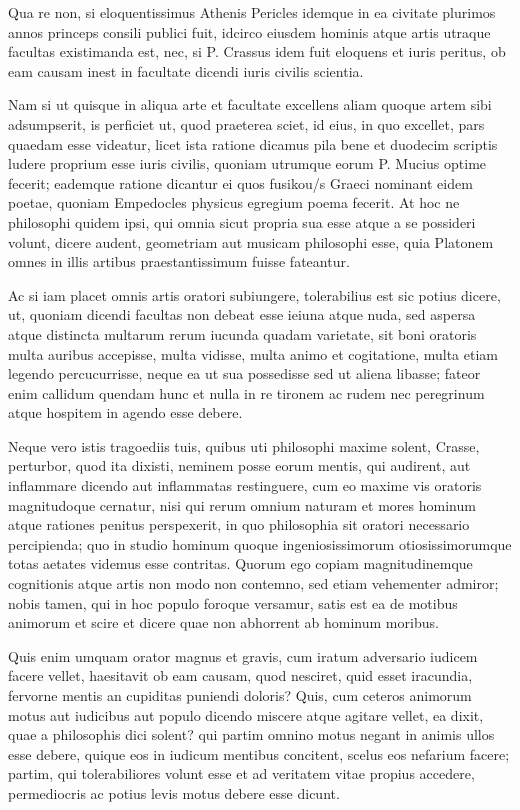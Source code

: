  Qua re non, si eloquentissimus Athenis Pericles idemque in ea civitate plurimos annos princeps consili publici fuit, idcirco eiusdem hominis atque artis utraque facultas existimanda est, nec, si P. Crassus idem fuit eloquens et iuris peritus, ob eam causam inest in facultate dicendi iuris civilis scientia.

 Nam si ut quisque in aliqua arte et facultate excellens aliam quoque artem sibi adsumpserit, is perficiet ut, quod praeterea sciet, id eius, in quo excellet, pars quaedam esse videatur, licet ista ratione dicamus pila bene et duodecim scriptis ludere proprium esse iuris civilis, quoniam utrumque eorum P. Mucius optime fecerit; eademque ratione dicantur ei quos fusikou/s Graeci nominant eidem poetae, quoniam Empedocles physicus egregium poema fecerit. At hoc ne philosophi quidem ipsi, qui omnia sicut propria sua esse atque a se possideri volunt, dicere audent, geometriam aut musicam philosophi esse, quia Platonem omnes in illis artibus praestantissimum fuisse fateantur.

 Ac si iam placet omnis artis oratori subiungere, tolerabilius est sic potius dicere, ut, quoniam dicendi facultas non debeat esse ieiuna atque nuda, sed aspersa atque distincta multarum rerum iucunda quadam varietate, sit boni oratoris multa auribus accepisse, multa vidisse, multa animo et cogitatione, multa etiam legendo percucurrisse, neque ea ut sua possedisse sed ut aliena libasse; fateor enim callidum quendam hunc et nulla in re tironem ac rudem nec peregrinum atque hospitem in agendo esse debere.

 Neque vero istis tragoediis tuis, quibus uti philosophi maxime solent, Crasse, perturbor, quod ita dixisti, neminem posse eorum mentis, qui audirent, aut inflammare dicendo aut inflammatas restinguere, cum eo maxime vis oratoris magnitudoque cernatur, nisi qui rerum omnium naturam et mores hominum atque rationes penitus perspexerit, in quo philosophia sit oratori necessario percipienda; quo in studio hominum quoque ingeniosissimorum otiosissimorumque totas aetates videmus esse contritas. Quorum ego copiam magnitudinemque cognitionis atque artis non modo non contemno, sed etiam vehementer admiror; nobis tamen, qui in hoc populo foroque versamur, satis est ea de motibus animorum et scire et dicere quae non abhorrent ab hominum moribus.

 Quis enim umquam orator magnus et gravis, cum iratum adversario iudicem facere vellet, haesitavit ob eam causam, quod nesciret, quid esset iracundia, fervorne mentis an cupiditas puniendi doloris? Quis, cum ceteros animorum motus aut iudicibus aut populo dicendo miscere atque agitare vellet, ea dixit, quae a philosophis dici solent? qui partim omnino motus negant in animis ullos esse debere, quique eos in iudicum mentibus concitent, scelus eos nefarium facere; partim, qui tolerabiliores volunt esse et ad veritatem vitae propius accedere, permediocris ac potius levis motus debere esse dicunt.

